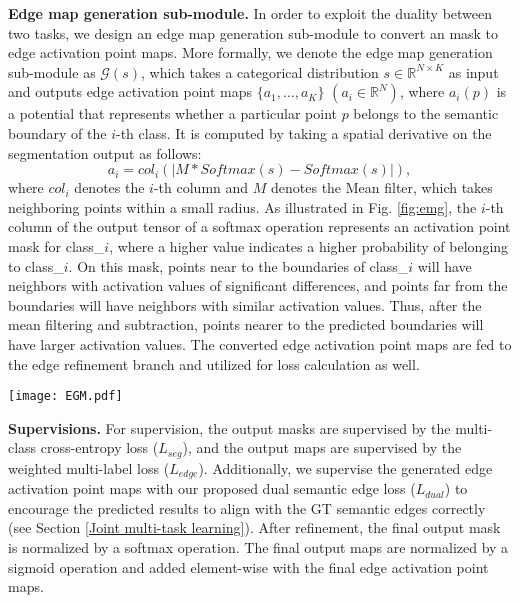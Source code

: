 \documentclass[runningheads]{llncs}
\begin{document}
\smallskip \noindent \textbf{Edge map generation {sub-module}.} In order to exploit the duality between two tasks, we design an edge map generation {sub-module} to convert a{n} {\SemSegPoint} mask to edge activation point maps. More formally, we denote the edge map generation {sub-module} as $\mathcal{G}(s)$, {which} takes a categorical distribution $s \in \mathbb{R}^{N \times K}$ as input and outputs edge activation point maps $\{a_{1},...,a_{K}\}$ $(a_i \in \mathbb{R}^{N})$, where $a_i(p)$ is a potential that represents whether a particular point $p$ belongs to the semantic boundary of the $i$-th class. It is computed by taking a spatial derivative on the segmentation output as follows:  
    \begin{equation}
        a_i = col_i(\lvert M * Softmax(s) - Softmax(s) \rvert),
        \label{eqn0}
    \end{equation} 
where {$col_i$ denotes the $i$-th column and} $M$ denotes the Mean filter, which takes neighboring points within a small radius. {As illustrated in Fig. \ref{fig:emg}, the $i$-th column of the output tensor of {a} softmax operation represents an activation point mask for class\_$i${,} where a higher value indicates a higher probability of belonging to class\_$i$. On this mask, points near to the boundaries of class\_$i$ will have neighbors with activation values of significant differences, and points far from the boundaries will have neighbors with similar activation values. Thus, after the mean filtering and subtraction, points nearer to the predicted boundaries will have larger activation values.}
The converted edge activation point maps are fed to the edge refinement branch and utilized for loss calculation as well.

\begin{figure*}[ht]
    \centering
    \texttt{[image: EGM.pdf]}
    \caption{Illustration of the edge map generation process on 2D points. (Left) An activation point mask, {with dark colors representing} high activation values. Three red points represent three different situations: far from the activated region, near the boundary, and within the activated region. (Middle) The activation point mask after the mean filtering; (Right) The generated edge activation point map.}
    \label{fig:emg}
\end{figure*}


\smallskip \noindent \textbf{Supervisions.}
For supervision, the output {\SemSegPoint} masks are supervised by the multi-class cross-entropy loss ($L_{seg}$), and the output {\SemEdgePoint} maps are supervised by the weighted multi-label loss ($L_{edge}$). Additionally, we supervise the generated edge activation point maps with {our proposed} dual semantic edge loss ($L_{dual}$) 
to encourage the predicted {\SemSeg} results to align with the GT semantic edges correctly (see Section \ref{Joint multi-task learning}). After refinement, the final output {\SemSegPoint} mask is normalized by a softmax operation. The final output {\SemEdgePoint} maps are normalized by a sigmoid operation and added element-wise with the final edge activation point maps.
\end{document}
